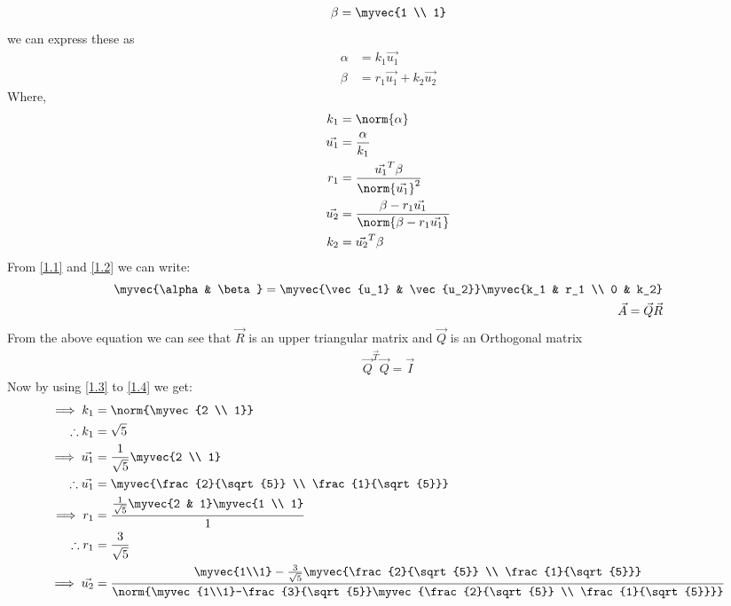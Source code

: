\documentclass[journal,12pt,twocolumn]{IEEEtran}
\begin{document}
\begin{enumerate}
\begin{align}
\beta=\myvec{1 \\ 1}
\end{align}
we can express these as 
\begin{align}
\alpha&=k_1{\vec{u_1}} \label{1.1}
\\
\beta&=r_1{\vec{u_1}}+k_2{\vec{u_2}} \label{1.2}
\end{align}
Where,
\begin{align}
k_1&=\norm{\alpha} \label{1.3}
\\
\vec{u_1}&=\frac{\alpha}{k_1}
\\
r_1&=\frac{\vec{u_1}^{T}{\beta}}{\norm{\vec{u_1}}^2}
\\
\vec{u_2}&=\frac{\beta-r_1{\vec{u_1}}}{\norm{\beta-r_1{\vec{u_1}}}}
\\
k_2&= \vec{u_2}^{T}{\beta} \label{1.4}
\end{align}
From \eqref{1.1} and \eqref{1.2} we can write:
\begin{align}
\myvec{\alpha & \beta}=\myvec{\vec{u_1} & \vec{u_2}}\myvec{k_1 & r_1 \\ 0 & k_2} \label{1.5}
\\
\vec{A}=\vec{Q}\vec{R} \label{1.6}
\end{align}
From the above equation we can see that $\vec{R}$ is an upper triangular matrix and $\vec{Q}$ is an Orthogonal matrix
\begin{align}
\vec{Q}^{\vec{T}}{\vec{Q}}=\Vec{I}
\end{align}
Now by using \eqref{1.3} to \eqref{1.4} we get: 
\begin{align}
\implies k_1&=\norm{\myvec{2 \\ 1}}
\\
\therefore k_1&=\sqrt{5}
\\
\implies \vec{u_1}&=\frac{1}{\sqrt{5}}\myvec{2 \\ 1}
\\
\therefore \vec{u_1}&=\myvec{\frac{2}{\sqrt{5}} \\ \frac{1}{\sqrt{5}}}
\\
\implies r_1&=\frac{\frac{1}{\sqrt{5}}\myvec{2 & 1}\myvec{1 \\ 1}}{1}
\\
\therefore r_1&=\frac{3}{\sqrt{5}}
\\
\implies \vec{u_2}&=\frac{\myvec{1\\1}-\frac{3}{\sqrt{5}}\myvec{\frac{2}{\sqrt{5}} \\ \frac{1}{\sqrt{5}}}}{\norm{\myvec{1\\1}-\frac{3}{\sqrt{5}}\myvec{\frac{2}{\sqrt{5}} \\ \frac{1}{\sqrt{5}}}}}

\end{align}
\end{enumerate}
\end{document}
